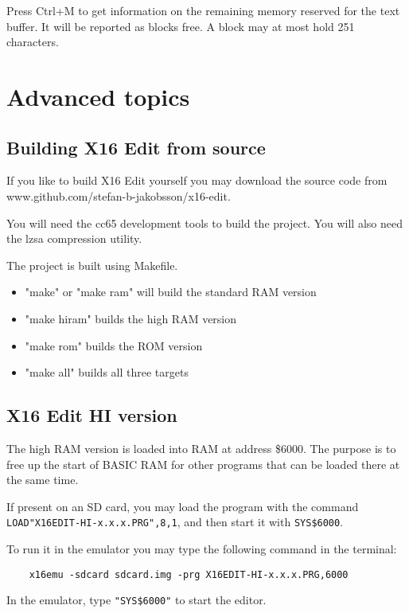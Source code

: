 \documentclass{article}
\begin{document}
        Press Ctrl+M to get information on the remaining memory reserved for the
        text buffer. It will be reported as blocks free. A block may at most hold 251 characters.

\section{Advanced topics}

    \subsection{Building X16 Edit from source}
        If you like to build X16 Edit yourself you may download the source code from
        www.github.com/stefan-b-jakobsson/x16-edit.

        You will need the cc65 development tools to build the project. You will also need the lzsa compression utility.

        The project is built using Makefile.

        \begin{itemize}
            \item "make" or "make ram" will build the standard RAM version
            \item "make hiram" builds the high RAM version
            \item "make rom" builds the ROM version
            \item "make all" builds all three targets
        \end{itemize}

    \subsection{X16 Edit HI version}
        The high RAM version is loaded into RAM at address \$6000. The purpose is to
        free up the start of BASIC RAM for other programs that can be loaded there at
        the same time.

        If present on an SD card, you may load the program with the command \break
        \texttt{LOAD"X16EDIT-HI-x.x.x.PRG",8,1}, and then
        start it with \texttt{SYS\$6000}.

        To run it in the emulator you may type the following command in the terminal:

\begin{verbatim}
    x16emu -sdcard sdcard.img -prg X16EDIT-HI-x.x.x.PRG,6000
\end{verbatim}
        In the emulator, type \texttt{"SYS\$6000"} to start the editor.
\end{document}
